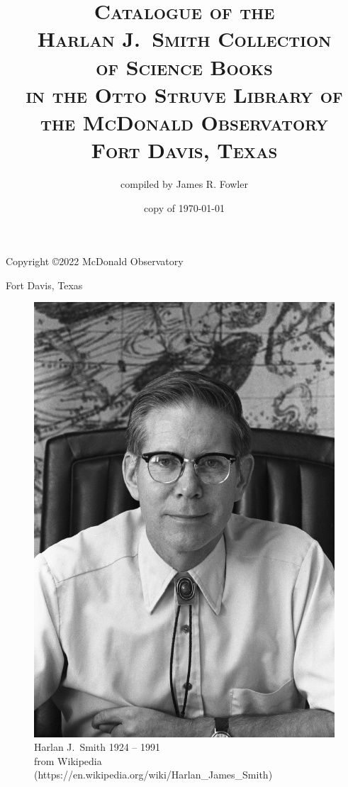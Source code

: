 \documentclass[letterpaper]{book}
\begin{document}
\frontmatter
\pagestyle{empty}
\title{\textsc{Catalogue of the \\
    Harlan J.\ Smith Collection \\
    of Science Books \\
    in the Otto Struve Library of \\
    the McDonald Observatory \\
    Fort Davis, Texas}}
\author{compiled by James R. Fowler}
\date{copy of \today}
\maketitle
\newpage
\vspace*{5 in}
\centerline{Copyright \copyright 2022 McDonald Observatory}
\centerline{Fort Davis, Texas}
\newpage

\pagestyle{plain}
\begin{figure}[t]
  \centering
  \includegraphics{hjs_photo.jpg}
  Harlan J.~Smith 1924 -- 1991 \\
  {\scriptsize from Wikipedia
  (https://en.wikipedia.org/wiki/Harlan\_James\_Smith)}
  \label{fig:hjs}
\end{figure}
\clearpage
\mbox{}
\thispagestyle{empty}
\newpage
\end{document}
